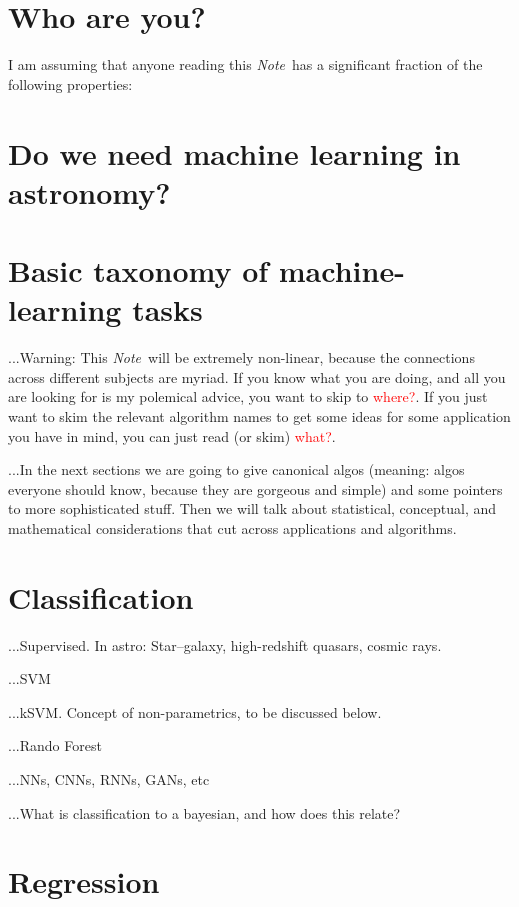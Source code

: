 \documentclass[12pt, letterpaper]{article}
\newcommand{\documentname}{\textsl{Note}}
\newcommand{\todo}[1]{\textcolor{red}{#1}}  %
\begin{document}
\clearpage\section{Who are you?}

I am assuming that anyone reading this \documentname\ has a
significant fraction of the following properties:

\section{Do we need machine learning in astronomy?}

\section{Basic taxonomy of machine-learning tasks}

...Warning: This \documentname\ will be extremely non-linear, because
the connections across different subjects are myriad. If you know what
you are doing, and all you are looking for is my polemical advice, you
want to skip to \todo{where?}. If you just want to skim the relevant
algorithm names to get some ideas for some application you have in
mind, you can just read (or skim) \todo{what?}.

...In the next sections we are going to give canonical algos (meaning:
algos everyone should know, because they are gorgeous and simple) and
some pointers to more sophisticated stuff. Then we will talk about
statistical, conceptual, and mathematical considerations that cut
across applications and algorithms.

\section{Classification}

...Supervised. In astro: Star--galaxy, high-redshift quasars, cosmic rays.

...SVM

...kSVM. Concept of non-parametrics, to be discussed below.

...Rando Forest

...NNs, CNNs, RNNs, GANs, etc

...What is classification to a bayesian, and how does this relate?

\section{Regression}
\end{document}
